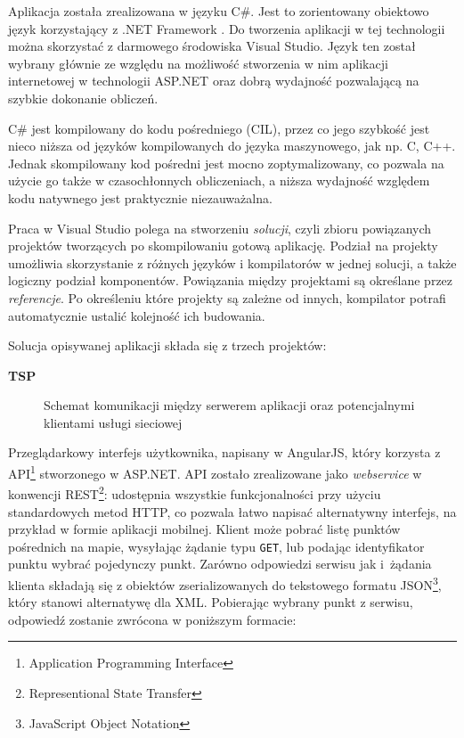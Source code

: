 Aplikacja została zrealizowana w języku C\#. Jest to zorientowany obiektowo język korzystający z .NET Framework \cite{csharp}. Do tworzenia aplikacji w tej technologii można skorzystać z darmowego środowiska Visual Studio. Język ten został wybrany głównie ze względu na możliwość stworzenia w nim aplikacji internetowej w technologii ASP.NET oraz dobrą wydajność pozwalającą na szybkie dokonanie obliczeń. 

C\# jest kompilowany do kodu pośredniego (CIL), przez co jego szybkość jest nieco niższa od języków kompilowanych do języka maszynowego, jak np. C, C++. Jednak skompilowany kod pośredni jest mocno zoptymalizowany, co pozwala na użycie go także w czasochłonnych obliczeniach, a niższa wydajność względem kodu natywnego jest praktycznie niezauważalna.

Praca w Visual Studio polega na stworzeniu \textit{solucji}, czyli zbioru powiązanych projektów tworzących po skompilowaniu gotową aplikację. Podział na projekty umożliwia skorzystanie z różnych języków i kompilatorów w jednej solucji, a także logiczny podział komponentów. Powiązania między projektami są określane przez \textit{referencje}. Po określeniu które projekty są zależne od innych, kompilator potrafi automatycznie ustalić kolejność ich budowania.

\noindent Solucja opisywanej aplikacji składa się z trzech projektów:

\medskip

\noindent \textbf{TSP} 

\begin{figure}
	\centering
	\def\svgwidth{\columnwidth}
	
	\caption{Schemat komunikacji między serwerem aplikacji oraz potencjalnymi klientami usługi sieciowej}
	\label{fig:rest_api}
\end{figure}

Przeglądarkowy interfejs użytkownika, napisany w AngularJS, który korzysta z API\footnote{Application Programming Interface} stworzonego w ASP.NET. API zostało zrealizowane jako \textit{webservice} w konwencji REST\footnote{Representional State Transfer}: udostępnia wszystkie funkcjonalności przy użyciu standardowych metod HTTP, co pozwala łatwo napisać alternatywny interfejs, na przykład w formie aplikacji mobilnej. Klient może pobrać listę punktów pośrednich na mapie, wysyłając żądanie typu \texttt{GET}, lub podając identyfikator punktu wybrać pojedynczy punkt. Zarówno odpowiedzi serwisu jak i~żądania klienta składają się z obiektów zserializowanych do tekstowego formatu JSON\footnote{JavaScript Object Notation}, który stanowi alternatywę dla XML. Pobierając wybrany punkt z serwisu, odpowiedź zostanie zwrócona w poniższym formacie:

